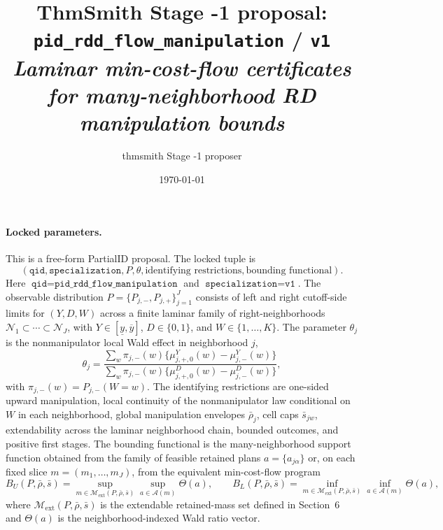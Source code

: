 \documentclass[11pt]{article}
\title{ThmSmith Stage -1 proposal: \texttt{pid\_rdd\_flow\_manipulation} / \texttt{v1}%
  \\ \large\textit{Laminar min-cost-flow certificates for many-neighborhood RD manipulation bounds}}
\author{thmsmith Stage -1 proposer}
\date{\today}
\newcommand{\calA}{\mathcal{A}}
\newcommand{\calM}{\mathcal{M}}
\theoremstyle{definition}
\theoremstyle{plain}
\theoremstyle{remark}
\begin{document}
\maketitle


\paragraph{Locked parameters.}
This is a free-form PartialID proposal.
The locked tuple is
\[
(\texttt{qid},\texttt{specialization},P,\theta,\text{identifying restrictions},\text{bounding functional}).
\]
Here \(\texttt{qid}=\texttt{pid\_rdd\_flow\_manipulation}\) and
\(\texttt{specialization}=\texttt{v1}\). The observable distribution
\(P=\{P_{j,-},P_{j,+}\}_{j=1}^J\) consists of left and right cutoff-side limits for
\((Y,D,W)\) across a finite laminar family of right-neighborhoods
\(\mathcal N_1\subset\cdots\subset\mathcal N_J\), with
\(Y\in[\underline y,\overline y]\), \(D\in\{0,1\}\), and
\(W\in\{1,\ldots,K\}\). The parameter \(\theta_j\) is the nonmanipulator local Wald
effect in neighborhood \(j\),
\[
\theta_j=
\frac{\sum_w \pi_{j,-}(w)\{\mu^Y_{j,+,0}(w)-\mu^Y_{j,-}(w)\}}
     {\sum_w \pi_{j,-}(w)\{\mu^D_{j,+,0}(w)-\mu^D_{j,-}(w)\}},
\]
with \(\pi_{j,-}(w)=P_{j,-}(W=w)\). The identifying restrictions are one-sided upward
manipulation, local continuity of the nonmanipulator law conditional on \(W\) in each
neighborhood, global manipulation envelopes \(\bar\rho_j\), cell caps \(\bar s_{jw}\),
extendability across the laminar neighborhood chain, bounded outcomes, and positive
first stages. The bounding functional is the many-neighborhood support function obtained
from the family of feasible retained plans \(a=\{a_{j\alpha}\}\) or, on each fixed slice
\(m=(m_1,\ldots,m_J)\), from the equivalent min-cost-flow program
\[
B_U(P,\bar\rho,\bar s)=\sup_{m\in\calM_{\mathrm{ext}}(P,\bar\rho,\bar s)}\sup_{a\in\calA(m)}\Theta(a),
\qquad
B_L(P,\bar\rho,\bar s)=\inf_{m\in\calM_{\mathrm{ext}}(P,\bar\rho,\bar s)}\inf_{a\in\calA(m)}\Theta(a),
\]
where \(\calM_{\mathrm{ext}}(P,\bar\rho,\bar s)\) is the extendable retained-mass set
defined in Section~6 and \(\Theta(a)\) is the neighborhood-indexed Wald ratio vector.
\end{document}
